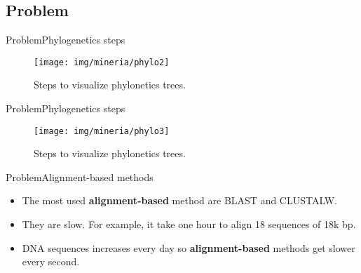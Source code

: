 \documentclass[10pt]{beamer}
\newcommand{\1}{
	\setbeamertemplate{background}{
		\texttt{[image: img/1]}
		\tikz[overlay] \fill[fill opacity=0.75,fill=white] (0,0) rectangle (-\paperwidth,\paperheight);
	}
}
\begin{document}
\subsection{Problem}

\begin{frame}{Problem}{Phylogenetics steps}
	\begin{figure}[]
		\centering
		\texttt{[image: img/mineria/phylo2]}
		\label{img:mot2}
		\caption{Steps to visualize phylonetics trees.}
	\end{figure}
\end{frame}

\begin{frame}{Problem}{Phylogenetics steps}
	\begin{figure}[]
		\centering
		\texttt{[image: img/mineria/phylo3]}
		\label{img:mot2}
		\caption{Steps to visualize phylonetics trees.}
	\end{figure}
\end{frame}


\begin{frame}{Problem}{Alignment-based methods}
	\begin{block}{}
		\begin{itemize}
			\item The most used \textbf{alignment-based} method are BLAST and CLUSTALW. \pause
			\item They are slow. For example, it take one hour to align 18 sequences of 18k bp. \pause
			\item DNA sequences increases every day so \textbf{alignment-based} methods get slower every second. \pause		 	
		\end{itemize}
	\end{block}
\end{frame}
\end{document}
